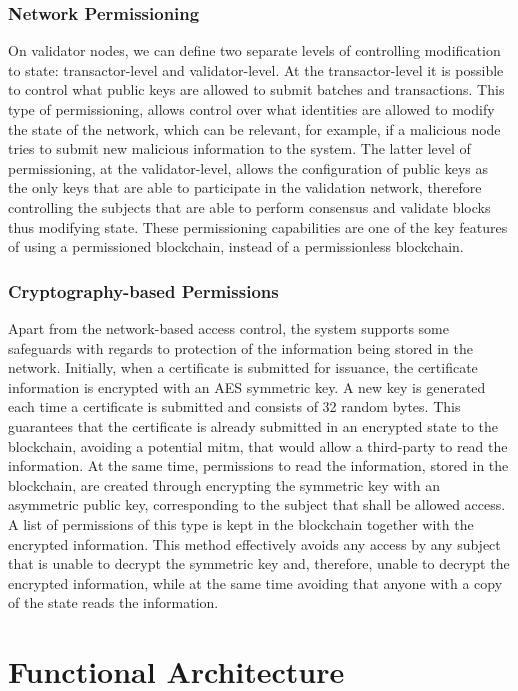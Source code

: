 \subsubsection{Network Permissioning}

On validator nodes, we can define two separate levels of controlling modification to state: transactor-level and validator-level. At the transactor-level it is possible to control what public keys are allowed to submit batches and transactions. This type of permissioning, allows control over what identities are allowed to modify the state of the network, which can be relevant, for example, if a malicious node tries to submit new malicious information to the system. The latter level of permissioning, at the validator-level, allows the configuration of public keys as the only keys that are able to participate in the validation network, therefore controlling the subjects that are able to perform consensus and validate blocks thus modifying state. These permissioning capabilities are one of the key features of using a permissioned blockchain, instead of a permissionless blockchain.

\subsubsection{Cryptography-based Permissions}

Apart from the network-based access control, the system supports some safeguards with regards to protection of the information being stored in the network. Initially, when a certificate is submitted for issuance, the certificate information is encrypted with an AES symmetric key. A new key is generated each time a certificate is submitted and consists of 32 random bytes. This guarantees that the certificate is already submitted in an encrypted state to the blockchain, avoiding a potential \gls{mitm}, that would allow a third-party to read the information. At the same time, permissions to read the information, stored in the blockchain, are created through encrypting the symmetric key with an asymmetric public key, corresponding to the subject that shall be allowed access. A list of permissions of this type is kept in the blockchain together with the encrypted information. This method effectively avoids any access by any subject that is unable to decrypt the symmetric key and, therefore, unable to decrypt the encrypted information, while at the same time avoiding that anyone with a copy of the state reads the information.

\section{Functional Architecture}
\label{sec:design-interaction}

